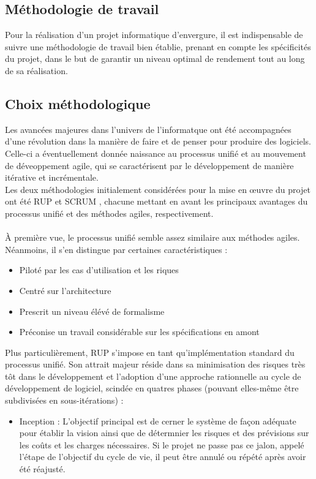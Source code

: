 \begin{spacing}{1.5}
\section{Méthodologie de travail}
Pour la réalisation d'un projet informatique d'envergure, il est indispensable de suivre une méthodologie de travail bien établie, prenant en compte les spécificités du projet, dans le but de garantir un niveau optimal de rendement tout au long de sa réalisation.
\subsection{Choix méthodologique}
Les avancées majeures dans l'univers de l'informatque ont été accompagnées d'une révolution dans la manière de faire et de penser pour produire des logiciels. Celle-ci a éventuellement donnée naissance au processus unifié et au mouvement de déveoppement agile, qui se caractérisent par le développement de manière itérative et incrémentale.\\
Les deux méthodologies initialement considérées pour la mise en œuvre du projet ont été RUP \cite{RUP} et SCRUM \cite{SCRUM}, chacune mettant en avant les principaux avantages du processus unifié et des méthodes agiles, respectivement.\\
\\
À première vue, le processus unifié semble assez similaire aux méthodes agiles. Néanmoins, il s'en distingue par certaines caractéristiques :
\begin{itemize}
\item Piloté par les cas d'utilisation et les riques
    \item Centré sur l'architecture
    \item Prescrit un niveau élévé de formalisme
    \item Préconise un travail considérable sur les spécifications en amont
\end{itemize}
Plus particulièrement, RUP s'impose en tant qu'implémentation standard du processus unifié. Son attrait majeur réside dans sa minimisation des risques très tôt dans le développement et l'adoption d'une approche rationnelle au cycle de développement de logiciel, scindée en quatres phases (pouvant elles-même être subdivisées en sous-itérations) :
\begin{itemize}
    \item Inception : L'objectif principal est de cerner le système de façon adéquate pour établir la vision ainsi que de détermnier les risques et des prévisions sur les coûts et les charges nécessaires. Si le projet ne passe pas ce jalon, appelé l'étape de l'objectif du cycle de vie, il peut être annulé ou répété après avoir été réajusté.

\end{itemize}
\end{spacing}
